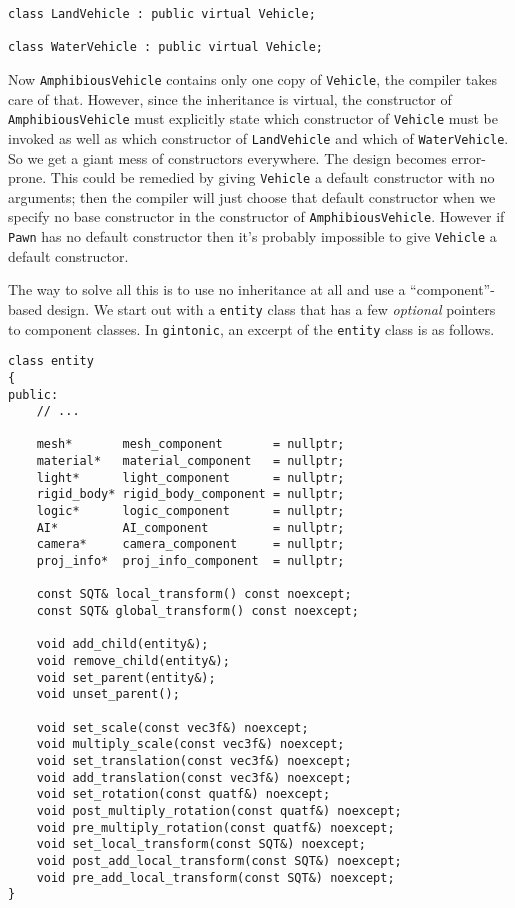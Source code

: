 \documentclass{article}
\begin{document}
\begin{lstlisting}
class LandVehicle : public virtual Vehicle;

class WaterVehicle : public virtual Vehicle;
\end{lstlisting}
Now \texttt{AmphibiousVehicle} contains only one copy of \texttt{Vehicle}, the compiler takes care of that. However, since the inheritance is virtual, the constructor of \texttt{AmphibiousVehicle} must explicitly state which constructor of \texttt{Vehicle} must be invoked as well as which constructor of \texttt{LandVehicle} and which of \texttt{WaterVehicle}. So we get a giant mess of constructors everywhere. The design becomes error-prone. This could be remedied by giving \texttt{Vehicle} a default constructor with no arguments; then the compiler will just choose that default constructor when we specify no base constructor in the constructor of \texttt{AmphibiousVehicle}. However if \texttt{Pawn} has no default constructor then it's probably impossible to give \texttt{Vehicle} a default constructor.

The way to solve all this is to use no inheritance at all and use a ``component''-based design. We start out with a \texttt{entity} class that has a few \textit{optional} pointers to component classes. In \texttt{gintonic}, an excerpt of the \texttt{entity} class is as follows.

\begin{lstlisting}
class entity
{
public:
	// ...

	mesh*       mesh_component       = nullptr;
	material*   material_component   = nullptr;
	light*      light_component      = nullptr;
	rigid_body* rigid_body_component = nullptr;
	logic*      logic_component      = nullptr;
	AI*         AI_component         = nullptr;
	camera*     camera_component     = nullptr;
	proj_info*  proj_info_component  = nullptr;

	const SQT& local_transform() const noexcept;
	const SQT& global_transform() const noexcept;

	void add_child(entity&);
	void remove_child(entity&);
	void set_parent(entity&);
	void unset_parent();

	void set_scale(const vec3f&) noexcept;
	void multiply_scale(const vec3f&) noexcept;
	void set_translation(const vec3f&) noexcept;
	void add_translation(const vec3f&) noexcept;
	void set_rotation(const quatf&) noexcept;
	void post_multiply_rotation(const quatf&) noexcept;
	void pre_multiply_rotation(const quatf&) noexcept;
	void set_local_transform(const SQT&) noexcept;
	void post_add_local_transform(const SQT&) noexcept;
	void pre_add_local_transform(const SQT&) noexcept;
}
\end{lstlisting}
\end{document}
